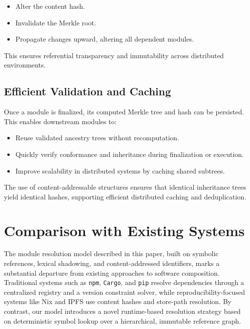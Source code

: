 \documentclass[sigplan,screen]{acmart}
\begin{document}
\begin{itemize}
    \item Alter the content hash.
    \item Invalidate the Merkle root.
    \item Propagate changes upward, altering all dependent modules.
\end{itemize}

This ensures referential transparency and immutability across distributed environments.

\subsection{Efficient Validation and Caching}

Once a module is finalized, its computed Merkle tree and hash can be persisted. This enables downstream modules to:

\begin{itemize}
    \item Reuse validated ancestry trees without recomputation.
    \item Quickly verify conformance and inheritance during finalization or execution.
    \item Improve scalability in distributed systems by cach\-ing shared subtrees.
\end{itemize}

The use of content-addressable structures ensures that identical inheritance trees yield identical hashes, supporting efficient distributed caching and deduplication.

\section{Comparison with Existing Systems}
\label{sec:comparison}

The module resolution model described in this paper, built on symbolic references, lexical shadowing, and content-addressed identifiers, marks a substantial departure from existing approaches to software composition. Traditional systems such as \texttt{npm}, \texttt{Cargo}, and \texttt{pip} resolve dependencies through a centralized registry and a version constraint solver, while reproducibility-focused systems like Nix and IPFS use content hashes and store-path resolution. By contrast, our model introduces a novel runtime-based resolution strategy based on deterministic symbol lookup over a hierarchical, immutable reference graph.
\end{document}
